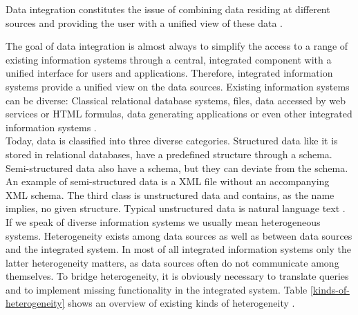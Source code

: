 Data integration constitutes the issue of combining data residing at different sources and providing the user with a unified view of these data \cite{Lenzerini:2002:DIT:543613.543644}. 

The goal of data integration is almost always to simplify the access to a range of existing information systems through a central, integrated component with a unified interface for users and applications. Therefore, integrated information systems provide a unified view on the data sources. Existing information systems can be diverse: Classical relational database systems, files, data accessed by web services or HTML formulas, data generating applications or even other integrated information systems \cite[p. 3-4]{DBLP:books/dp/LeserN2006}.\\
Today, data is classified into three diverse categories. Structured data like it is stored in relational databases, have a predefined structure through a schema.
Semi-structured data also have a schema, but they can deviate from the schema. An example of semi-structured data is a XML file without an accompanying XML schema. The third class is unstructured data and contains, as the name implies, no given structure. Typical unstructured data is natural language text \cite[p. 17]{DBLP:books/dp/LeserN2006}.\\
If we speak of diverse information systems we usually mean heterogeneous systems. Heterogeneity exists among data sources as well as between data sources and the integrated system. In most of all integrated information systems only the latter heterogeneity matters, as data sources often do not communicate among themselves. 
To bridge heterogeneity, it is obviously necessary to translate queries and to implement missing functionality in the integrated system. Table \ref{kinds-of-heterogeneity} shows an overview of existing kinds of heterogeneity \cite[p. 60/61]{DBLP:books/dp/LeserN2006}.

